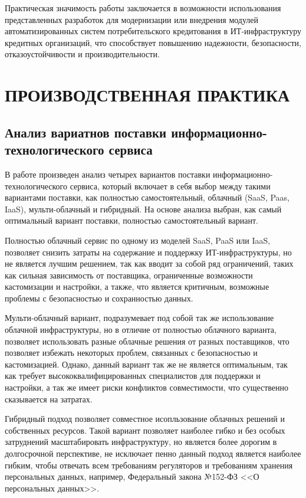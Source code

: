 \documentclass[14pt, a4paper]{extarticle}
\begin{document}
Практическая значимость работы заключается в возможности использования представленных
разработок для модернизации или внедрения модулей автоматизированных систем
потребительского кредитования в ИТ-инфраструктуру кредитных организаций, что
способствует повышению надежности, безопасности, отказоустойчивости и производительности.

\section{ПРОИЗВОДСТВЕННАЯ ПРАКТИКА}

\subsection{Анализ вариатнов поставки информационно-технологического сервиса}

В работе произведен анализ четырех вариантов поставки
информационно-технологического сервиса, который включает в себя выбор между
такими вариантами поставки, как полностью самостоятельный, облачный (SaaS, Paas, IaaS),
мульти-облачный и гибридный. На основе анализа выбран, как самый оптимальный вариант
поставки, полностью самостоятельный вариант.

Полностью облачный сервис \cite{micrasoft-azure-book} по одному из моделей SaaS,
PaaS или IaaS, позволяет снизить затраты на содержание и поддержку ИТ-инфраструктуры,
но не является лучшим решением, так как вводит за собой ряд ограничений, таких как
сильная зависимость от поставщика, ограниченные возможности кастомизации и настройки,
а также, что является критичным, возможные проблемы с безопасностью и сохранностью данных.

Мульти-облачный вариант, подразумевает под собой так же использование облачной
инфраструктуры, но в отличие от полностью облачного варианта, позволяет использовать
разные облачные решения от разных поставщиков, что позволяет избежать
некоторых проблем, связанных с безопасностью и кастомизацией. Однако, данный
вариант так же не является оптимальным, так как требует высококвалифицированных
специалистов для поддержки и настройки, а так же имеет риски конфликтов совместимости,
что существенно сказывается на затратах.

Гибридный подход позволяет совместное исопльзование облачных решений и собственных
ресурсов. Такой вариант позволяет наиболее гибко и без особых затруднений масштабировать
инфраструктуру, но является более дорогим в долгосрочной перспективе, не исключает
пенно данный подход является наиболее гибким, чтобы отвечать всем требованиям
регуляторов и требованиям хранения персональных данных, например, Федеральный закона
№152-ФЗ <<О персональных данных>>.
\end{document}

